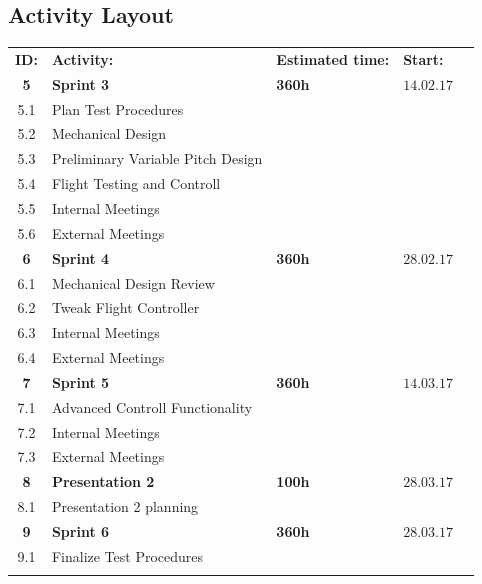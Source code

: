 \begin{center}
\section*{\textbf{Activity Layout}}
\begin{tabular}{cllll}
\rowcolor{cadetgrey}
\textbf{ID:}    &\textbf{Activity:} 	 &\textbf{Estimated time:}    &\textbf{Start:}  \\ %
\rowcolor{gainsboro}
\textbf{5} & \textbf{Sprint 3}     & \textbf{360h}     & $14.02.17$ \\
5.1     & Plan Test Procedures &  &  \\\rowcolor{gainsboro}
5.2     & Mechanical Design &  &  \\
5.3     & Preliminary Variable Pitch Design & & 
\\\rowcolor{gainsboro}
5.4     & Flight Testing and Controll &  & \\
5.5       & Internal Meetings      &    & 
\\\rowcolor{gainsboro}
5.6       & External Meetings      &    & \\
\textbf{6} & \textbf{Sprint 4}     & \textbf{360h}     & $28.02.17$ \\
\rowcolor{gainsboro}
6.1     & Mechanical Design Review & & \\
6.2     & Tweak Flight Controller & & 
\\\rowcolor{gainsboro}
6.3       & Internal Meetings      &    & \\
6.4       & External Meetings      &    & 
\\\rowcolor{gainsboro}
\textbf{7} & \textbf{Sprint 5}     & \textbf{360h}     & $14.03.17$ \\
7.1     & Advanced Controll Functionality &  & \\\rowcolor{gainsboro}
7.2       & Internal Meetings      &    & \\
7.3       & External Meetings      &    & 
\\\rowcolor{gainsboro}
\textbf{8} & \textbf{Presentation 2}     & \textbf{100h}     & $28.03.17$ \\
8.1     & Presentation 2 planning &  &  \\\rowcolor{gainsboro}
\textbf{9} & \textbf{Sprint 6}     & \textbf{360h}     & $28.03.17$ \\
9.1     & Finalize Test Procedures &  & 
\\\rowcolor{gainsboro}

\end{tabular}
\end{center}
